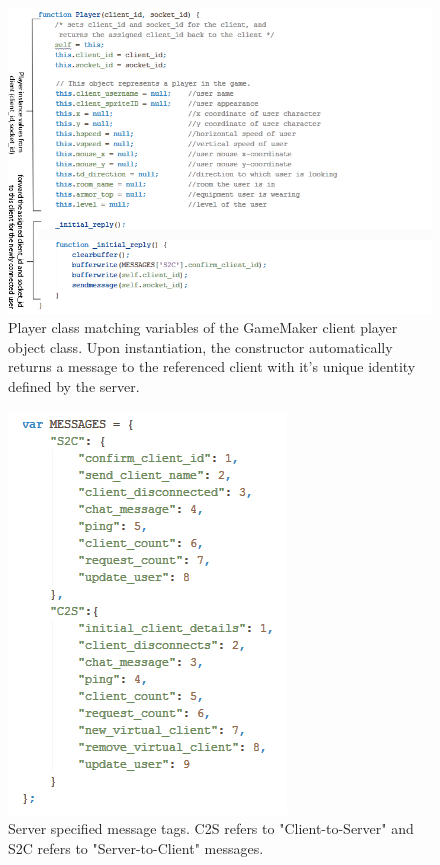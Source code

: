 \documentclass[bsc,frontabs,twoside,singlespacing,parskip,deptreport]{infthesis}     %
\begin{document}
\begin{figure}[H]
\includegraphics[scale=0.75]{images/server_player_construct.jpg}
\caption{Player class matching variables of the GameMaker client player object class. Upon instantiation, the constructor automatically returns a message to the referenced client with it's unique identity defined by the server.}
\label{fig:server_player_construct}
\vspace{1em}
\end{figure}

\begin{figure}[H]
\includegraphics[scale=0.75]{images/server_message_tags.jpg}
\caption{Server specified message tags. C2S refers to "Client-to-Server" and S2C refers to "Server-to-Client" messages.}
\label{fig:server_message_tags}
\vspace{1em}
\end{figure}
\end{document}
